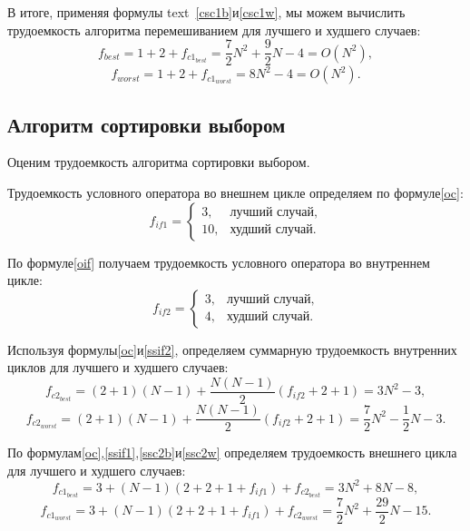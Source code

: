 В итоге, применяя формулы text{~}\eqref{csc1b}\text{~}и\text{~}\eqref{csc1w}, мы можем вычислить трудоемкость алгоритма перемешиванием для лучшего и худшего случаев:
\begin{equation}\label{csb}
	f_{best} = 1 + 2 + f_{c1_{best}} = \frac{7}{2}N^2 + \frac{9}{2}N - 4 = O(N^2),
\end{equation}
\begin{equation}\label{csw}
	f_{worst} = 1 + 2 + f_{c1_{worst}} = 8N^2 - 4 = O(N^2).
\end{equation}

\subsection{Алгоритм сортировки выбором}

Оценим трудоемкость алгоритма сортировки выбором.

Трудоемкость условного оператора во внешнем цикле определяем по формуле\text{~}\eqref{oc}:
\begin{equation}\label{ssif1}
	f_{if1} = 
	\begin{cases}
		3, & \text{лучший случай}, \\
		10, & \text{худший случай}.
	\end{cases}
\end{equation}

По формуле\text{~}\eqref{oif} получаем трудоемкость условного оператора во внутреннем цикле:
\begin{equation}\label{ssif2}
	f_{if2} = 
	\begin{cases}
		3, & \text{лучший случай}, \\
		4, & \text{худший случай}.
	\end{cases}
\end{equation}

Используя формулы\text{~}\eqref{oc}\text{~}и\text{~}\eqref{ssif2}, определяем суммарную трудоемкость внутренних циклов для лучшего и худшего случаев:
\begin{equation}\label{ssc2b}
	f_{c2_{best}} = (2 + 1)(N - 1) + \frac{N(N - 1)}{2}(f_{if2} + 2 + 1) = 3N^2 - 3,
\end{equation}
\begin{equation}\label{ssc2w}
	f_{c2_{worst}} = (2 + 1)(N - 1) + \frac{N(N - 1)}{2}(f_{if2} + 2 + 1) = \frac{7}{2}N^2 - \frac{1}{2}N - 3.
\end{equation}

По формулам\text{~}\eqref{oc},\text{~}\eqref{ssif1},\text{~}\eqref{ssc2b}\text{~}и\text{~}\eqref{ssc2w} определяем трудоемкость внешнего цикла для лучшего и худшего случаев:
\begin{equation}\label{ssc1b}
	f_{c1_{best}} = 3 + (N - 1)(2 + 2 + 1 + f_{if1}) + f_{c2_{best}} = 3N^2 + 8N - 8,
\end{equation}
\begin{equation}\label{ssc1w}
	f_{c1_{worst}} = 3 + (N - 1)(2 + 2 + 1 + f_{if1}) + f_{c2_{worst}} = \frac{7}{2}N^2 + \frac{29}{2}N - 15.
\end{equation}

